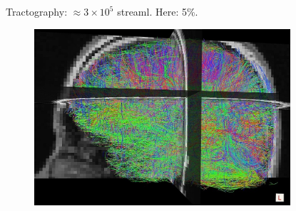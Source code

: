 \documentclass{beamer}
\begin{document}
\begin{frame}{Tractography: $\approx 3 \times 10^5$ streaml. Here: 5\%.}
  \begin{figure}
    \centering
  \includegraphics[width=9.5cm]{tractography}
  \end{figure}
\end{frame}
\end{document}
